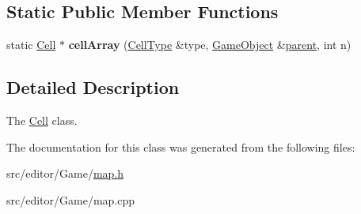 \subsection*{\-Static \-Public \-Member \-Functions}
\begin{DoxyCompactItemize}
\item 
\hypertarget{class_cell_a092f9ba84bb9c28aabf6cfb963b14e33}{static \hyperlink{class_cell}{\-Cell} $\ast$ {\bfseries cell\-Array} (\hyperlink{class_cell_type}{\-Cell\-Type} \&type, \hyperlink{class_game_object}{\-Game\-Object} \&\hyperlink{class_game_object_af3deaf39cde23c189765634e32e95bb4}{parent}, int n)}\label{class_cell_a092f9ba84bb9c28aabf6cfb963b14e33}

\end{DoxyCompactItemize}


\subsection{\-Detailed \-Description}
\-The \hyperlink{class_cell}{\-Cell} class. 

\-The documentation for this class was generated from the following files\-:\begin{DoxyCompactItemize}
\item 
src/editor/\-Game/\hyperlink{map_8h}{map.\-h}\item 
src/editor/\-Game/map.\-cpp\end{DoxyCompactItemize}
